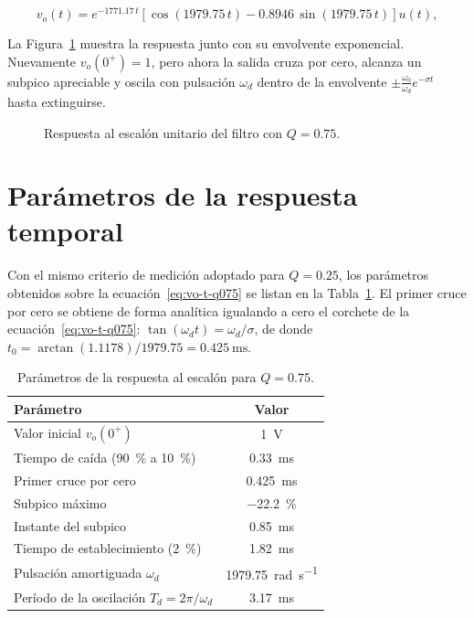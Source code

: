\begin{equation}
  v_o(t) = e^{-\num{1771.17}\, t}
           \left[\cos\left(\num{1979.75}\, t\right) - \num{0.8946}\, \sin\left(\num{1979.75}\, t\right)\right] u(t),
  \label{eq:vo-t-q075}
\end{equation}


La Figura~\ref{fig:escalon-q075} muestra la respuesta junto con
su envolvente exponencial. Nuevamente $v_o(0^+) = 1$, pero ahora la salida cruza por cero, alcanza un
subpico apreciable y oscila con pulsación $\omega_d$ dentro de la envolvente
$\pm\frac{\omega_0}{\omega_d} e^{-\sigma t}$ hasta extinguirse.

\begin{figure}[!ht]
  \centering
  
  \caption{Respuesta al escalón unitario del filtro con $Q = \num{0.75}$.}
  \label{fig:escalon-q075}
\end{figure}

\section{Parámetros de la respuesta temporal}

Con el mismo criterio de medición adoptado para $Q = \num{0.25}$, los parámetros obtenidos sobre la
ecuación~\eqref{eq:vo-t-q075} se listan en la Tabla~\ref{tab:parametros-q075}. El primer cruce por cero se
obtiene de forma analítica igualando a cero el corchete de la ecuación~\eqref{eq:vo-t-q075}:
$\tan(\omega_d t) = \omega_d/\sigma$, de donde
$t_0 = \arctan(\num{1.1178})/\num{1979.75} = \qty{0.425}{\milli\second}$.

\begin{table}[H]
  \centering
  \begin{tabular}{|l|c|}
    \hline
    Parámetro & Valor \\
    \hline
    Valor inicial $v_o(0^+)$                                  & \qty{1}{\volt} \\
    Tiempo de caída (\qty{90}{\percent} a \qty{10}{\percent}) & \qty{0.33}{\milli\second} \\
    Primer cruce por cero                                     & \qty{0.425}{\milli\second} \\
    Subpico máximo                                            & \qty{-22.2}{\percent} \\
    Instante del subpico                                      & \qty{0.85}{\milli\second} \\
    Tiempo de establecimiento (\qty{2}{\percent})             & \qty{1.82}{\milli\second} \\
    Pulsación amortiguada $\omega_d$                          & \qty{1979.75}{\radian\per\second} \\
    Período de la oscilación $T_d = 2\pi/\omega_d$            & \qty{3.17}{\milli\second} \\
    \hline
  \end{tabular}
  \caption{Parámetros de la respuesta al escalón para $Q = \num{0.75}$.}
  \label{tab:parametros-q075}
\end{table}

